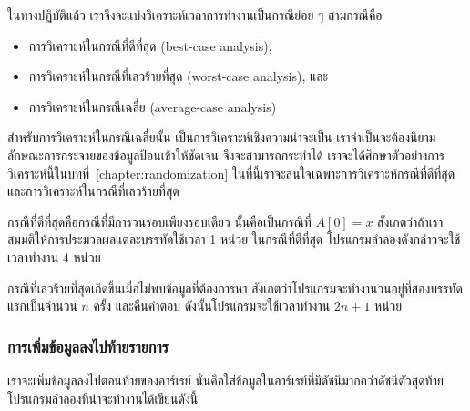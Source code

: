 ใน{\wbr}ทาง{\wbr}ปฏิบัติ{\wbr}แล้ว เรา{\wbr}จึง{\wbr}จะ{\wbr}แบ่ง{\wbr}วิเคราะห์{\wbr}เวลา{\wbr}การ{\wbr}ทำงาน{\wbr}เป็น{\wbr}กรณี{\wbr}ย่อย ๆ สาม{\wbr}กรณี{\wbr}คือ{\wbr}
\begin{itemize}
\item การ{\wbr}วิเคราะห์{\wbr}ใน{\wbr}กรณี{\wbr}ที่{\wbr}ดี{\wbr}ที่สุด (best-case analysis),
\item การ{\wbr}วิเคราะห์{\wbr}ใน{\wbr}กรณี{\wbr}ที่{\wbr}เลวร้าย{\wbr}ที่สุด (worst-case analysis), และ{\wbr}
\item การ{\wbr}วิเคราะห์{\wbr}ใน{\wbr}กรณี{\wbr}เฉลี่ย (average-case analysis)
\end{itemize}

สำหรับ{\wbr}การ{\wbr}วิเคราะห์{\wbr}ใน{\wbr}กรณี{\wbr}เฉลี่ย{\wbr}นั้น เป็น{\wbr}การ{\wbr}วิเคราะห์{\wbr}เชิง{\wbr}ความน่าจะเป็น{\wbr}
เรา{\wbr}จำเป็น{\wbr}จะ{\wbr}ต้อง{\wbr}นิยาม{\wbr}ลักษณะ{\wbr}การ{\wbr}กระจาย{\wbr}ของ{\wbr}ข้อมูล{\wbr}ป้อน{\wbr}เข้า{\wbr}ให้{\wbr}ชัดเจน จึง{\wbr}จะ{\wbr}สามารถ{\wbr}กระทำ{\wbr}ได้{\wbr}
เรา{\wbr}จะ{\wbr}ได้{\wbr}ศึกษา{\wbr}ตัวอย่าง{\wbr}การ{\wbr}วิเคราะห์{\wbr}นี้{\wbr}ใน{\wbr}บท{\wbr}ที่~\ref{chapter:randomization}
ใน{\wbr}ที่นี้{\wbr}เรา{\wbr}จะ{\wbr}สนใจ{\wbr}เฉพาะ{\wbr}การ{\wbr}วิเคราะห์{\wbr}กรณี{\wbr}ที่{\wbr}ดี{\wbr}ที่สุด และ{\wbr}การ{\wbr}วิเคราะห์{\wbr}ใน{\wbr}กรณี{\wbr}ที่{\wbr}เลวร้าย{\wbr}ที่สุด{\wbr}

กรณี{\wbr}ที่{\wbr}ดี{\wbr}ที่สุด{\wbr}คือ{\wbr}กรณี{\wbr}ที่{\wbr}มี{\wbr}การ{\wbr}วน{\wbr}รอบ{\wbr}เพียง{\wbr}รอบ{\wbr}เดียว นั้น{\wbr}คือ{\wbr}เป็น{\wbr}กรณี{\wbr}ที่ $A[0] = x$
สังเกต{\wbr}ว่า{\wbr}ถ้า{\wbr}เรา{\wbr}สมมติ{\wbr}ให้การ{\wbr}ประมวลผล{\wbr}แต่ละ{\wbr}บรรทัด{\wbr}ใช้เวลา 1 หน่วย ใน{\wbr}กรณี{\wbr}ที่{\wbr}ดี{\wbr}ที่สุด{\wbr}
โปรแกรม{\wbr}ลำ{\wbr}ลอง{\wbr}ดังกล่าว{\wbr}จะ{\wbr}ใช้เวลา{\wbr}ทำงาน $4$ หน่วย{\wbr}

กรณี{\wbr}ที่{\wbr}เลวร้าย{\wbr}ที่สุด{\wbr}เกิด{\wbr}ขึ้น{\wbr}เมื่อ{\wbr}ไม่{\wbr}พบ{\wbr}ข้อมูล{\wbr}ที่{\wbr}ต้องการ{\wbr}หา{\wbr}
สังเกต{\wbr}ว่า{\wbr}โปรแกรม{\wbr}จะ{\wbr}ทำงาน{\wbr}วน{\wbr}อยู่{\wbr}ที่{\wbr}สอง{\wbr}บรรทัด{\wbr}แรก{\wbr}เป็น{\wbr}จำนวน $n$ ครั้ง และ{\wbr}คืนคำ{\wbr}ตอบ{\wbr}
ดังนั้น{\wbr}โปรแกรม{\wbr}จะ{\wbr}ใช้เวลา{\wbr}ทำงาน $2n + 1$ หน่วย{\wbr}

\subsubsection{การ{\wbr}เพิ่ม{\wbr}ข้อมูล{\wbr}ลง{\wbr}ไป{\wbr}ท้าย{\wbr}รายการ}

เรา{\wbr}จะ{\wbr}เพิ่ม{\wbr}ข้อมูล{\wbr}ลง{\wbr}ไป{\wbr}ตอน{\wbr}ท้าย{\wbr}ของ{\wbr}อาร์เรย์
นั่น{\wbr}คือ{\wbr}ใส่{\wbr}ข้อมูล{\wbr}ใน{\wbr}อาร์เรย์{\wbr}ที่{\wbr}มี{\wbr}ดัชนี{\wbr}มาก{\wbr}กว่า{\wbr}ดัชนี{\wbr}ตัว{\wbr}สุดท้าย{\wbr}
โปรแกรม{\wbr}ลำ{\wbr}ลอง{\wbr}ที่{\wbr}น่าจะ{\wbr}ทำงาน{\wbr}ได้{\wbr}เขียน{\wbr}ดังนี้{\wbr}

